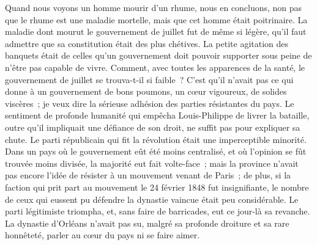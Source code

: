\documentclass[french,twoside]{book} %
\begin{document}
Quand nous voyons un homme mourir d’un rhume, nous en concluons, non pas que le rhume est une maladie mortelle, mais que cet homme était poitrinaire. La maladie dont mourut le gouvernement de juillet fut de même si légère, qu’il faut admettre que sa constitution était des plus chétives. La petite agitation des banquets était de celles qu’un gouvernement doit pouvoir supporter sous peine de n’être pas capable de vivre. Comment, avec toutes les apparences de la santé, le gouvernement de juillet se trouva-t-il si faible ? C’est qu’il n’avait pas ce qui donne à un gouvernement de bons poumons, un cœur vigoureux, de solides viscères ; je veux dire la sérieuse adhésion des parties résistantes du pays. Le sentiment de profonde humanité qui empêcha Louis-Philippe de livrer la bataille, outre qu’il impliquait une défiance de son droit, ne suffit pas pour expliquer sa chute. Le parti républicain qui fit la révolution était une imperceptible minorité. Dans un pays où le gouvernement eût été moins centralisé, et où l’opinion se fût trouvée moins divisée, la majorité eut fait volte-face ; mais la province n’avait pas encore l’idée de résister à un mouvement venant de Paris ; de plus, si la faction qui prit part au mouvement le 24 février 1848 fut insignifiante, le nombre de ceux qui eussent pu défendre la dynastie vaincue était peu considérable. Le parti légitimiste triompha, et, sans faire de barricades, eut ce jour-là sa revanche. La dynastie d’Orléans n’avait pas su, malgré sa profonde droiture et sa rare honnêteté, parler au cœur du pays ni se faire aimer.\par
\end{document}
